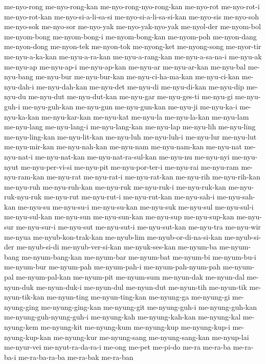 {me-nyo-rong me-nyo-rong-kan me-nyo-rong-nyo-rong-kan me-nyo-rot
me-nyo-rot-i me-nyo-rot-kan me-nyo-si-a-li-sa-si me-nyo-si-a-li-sa-si-kan
me-nyo-sis me-nyo-soh me-nyo-sok me-nyo-sor me-nyo-yak me-nyo-yak-nyo-yak
me-nyol-der me-nyom-bol me-nyom-bong me-nyom-bong-i me-nyom-bong-kan
me-nyom-poh me-nyon-dang me-nyon-dong me-nyon-tek me-nyon-tok me-nyong-ket
me-nyong-song me-nyor-tir me-nyu-a-ka-kan me-nyu-a-ra-kan
me-nyu-a-rang-kan me-nyu-a-sa-na-i me-nyu-ak me-nyu-ap me-nyu-ap-i
me-nyu-ap-kan me-nyu-ar me-nyu-ar-kan me-nyu-bal me-nyu-bang me-nyu-bur
me-nyu-bur-kan me-nyu-ci-ha-ma-kan me-nyu-ci-kan me-nyu-dah-i
me-nyu-dah-kan me-nyu-det me-nyu-di me-nyu-di-kan me-nyu-dip me-nyu-du
me-nyu-dut me-nyu-dut-kan me-nyu-gar me-nyu-ges-ti me-nyu-gi me-nyu-guh-i
me-nyu-guh-kan me-nyu-gun me-nyu-gun-kan me-nyu-ji me-nyu-ka-i
me-nyu-ka-kan me-nyu-kar-kan me-nyu-kat me-nyu-la me-nyu-la-kan me-nyu-lam
me-nyu-lang me-nyu-lang-i me-nyu-lang-kan me-nyu-lap me-nyu-lih
me-nyu-ling me-nyu-ling-kan me-nyu-lit-kan me-nyu-luh me-nyu-luh-i
me-nyu-lur me-nyu-lut me-nyu-mir-kan me-nyu-nah-kan me-nyu-nam
me-nyu-nam-kan me-nyu-nat me-nyu-nat-i me-nyu-nat-kan
me-nyu-nat-ra-sul-kan me-nyu-nu me-nyu-nyi me-nyu-nyut me-nyu-per-vi-si
me-nyu-pit me-nyu-por-ter-i me-nyu-rai me-nyu-ram me-nyu-ram-kan
me-nyu-rat me-nyu-rat-i me-nyu-rat-kan me-nyu-rih me-nyu-rih-kan
me-nyu-ruh me-nyu-ruh-kan me-nyu-ruk me-nyu-ruk-i me-nyu-ruk-kan
me-nyu-ruk-nyu-ruk me-nyu-rut me-nyu-rut-i me-nyu-rut-kan me-nyu-sah-i
me-nyu-sah-kan me-nyu-su me-nyu-su-i me-nyu-su-kan me-nyu-suk me-nyu-sul
me-nyu-sul-i me-nyu-sul-kan me-nyu-sun me-nyu-sun-kan me-nyu-sup
me-nyu-sup-kan me-nyu-sur me-nyu-sur-i me-nyu-sut me-nyu-sut-i
me-nyu-sut-kan me-nyu-tra me-nyu-wir me-nyua me-nyub-kon-trak-kan
me-nyub-lim me-nyub-or-di-na-si-kan me-nyub-si-der me-nyub-si-di
me-nyub-ver-si-kan me-nyuk-ses-kan me-nyum-ba me-nyum-bang
me-nyum-bang-kan me-nyum-bar me-nyum-bat me-nyum-bi me-nyum-bu-i
me-nyum-bur me-nyum-pah me-nyum-pah-i me-nyum-pah-nyum-pah me-nyum-pal
me-nyum-pal-kan me-nyum-pit me-nyum-sum me-nyun-dak me-nyun-dal
me-nyun-duk me-nyun-duk-i me-nyun-dul me-nyun-dut me-nyun-tih me-nyun-tik
me-nyun-tik-kan me-nyun-ting me-nyun-ting-kan me-nyung-ga me-nyung-gi
me-nyung-ging me-nyung-ging-kan me-nyung-git me-nyung-guh-i
me-nyung-guh-kan me-nyung-guh-nyung-guh-i me-nyung-kah me-nyung-kah-kan
me-nyung-kal me-nyung-kem me-nyung-kit me-nyung-kum me-nyung-kup
me-nyung-kup-i me-nyung-kup-kan me-nyung-kur me-nyung-sang
me-nyung-sang-kan me-nyup-lai me-nyur-vei me-nyut-ra-da-ra-i me-ong me-pet
me-pi-do me-ra me-ra-ba me-ra-ba-i me-ra-ba-ra-ba me-ra-bak me-ra-ban
}
